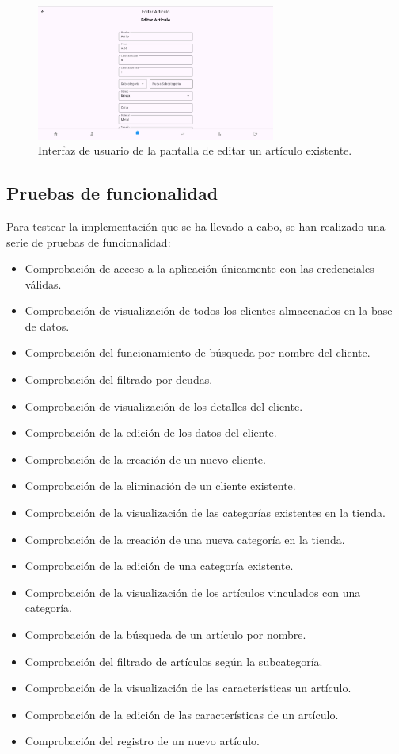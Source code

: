 \begin{figure}[H]
	\centering
	\includegraphics[width=0.7\textwidth]{imagenes/PrimeraIteracion/editarArticulo.png}
	\caption{Interfaz de usuario de la pantalla de editar un artículo existente.}
	\label{fig:appEditarArticulo}
\end{figure}

\subsection{Pruebas de funcionalidad}

Para testear la implementación que se ha llevado a cabo, se han realizado una serie de pruebas de funcionalidad: 

\begin{itemize}
	\item Comprobación de acceso a la aplicación únicamente con las credenciales válidas. 
	\item Comprobación de visualización de todos los clientes almacenados en la base de datos. 
	\item Comprobación del funcionamiento de búsqueda por nombre del cliente. 
	\item Comprobación del filtrado por deudas. 
	\item Comprobación de visualización de los detalles del cliente. 
	\item Comprobación de la edición de los datos del cliente. 
	\item Comprobación de la creación de un nuevo cliente. 
	\item Comprobación de la eliminación de un cliente existente. 
	\item Comprobación de la visualización de las categorías existentes en la tienda. 
	\item Comprobación de la creación de una nueva categoría en la tienda. 
	\item Comprobación de la edición de una categoría existente. 
	\item Comprobación de la visualización de los artículos vinculados con una categoría. 
	\item Comprobación de la búsqueda de un artículo por nombre. 
	\item Comprobación del filtrado de artículos según la subcategoría. 
	\item Comprobación de la visualización de las características un artículo. 
	\item Comprobación de la edición de las características de un artículo. 
	\item Comprobación del registro de un nuevo artículo. 
\end{itemize}




